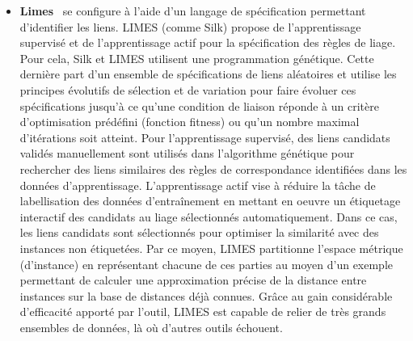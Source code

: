 \begin{itemize}
\item \textbf{Limes}~\cite{Ngomo2011} se configure à l'aide d'un langage de spécification permettant d'identifier les liens. LIMES (comme Silk) propose de l'apprentissage supervisé  et de l'apprentissage actif pour la spécification des règles de liage. Pour cela, Silk et LIMES utilisent une programmation génétique. Cette dernière part d'un ensemble de spécifications de liens aléatoires et utilise les principes évolutifs de sélection et de variation pour faire évoluer ces spécifications jusqu'à ce qu'une condition de liaison réponde à un critère d'optimisation prédéfini (fonction fitness) ou qu'un nombre maximal d'itérations soit atteint. Pour l'apprentissage supervisé, des liens candidats validés manuellement sont utilisés dans l'algorithme génétique pour rechercher des liens similaires des règles de correspondance identifiées dans les données d'apprentissage. L’apprentissage actif vise à réduire la tâche de labellisation des données d'entraînement en mettant en oeuvre un étiquetage interactif des candidats au liage sélectionnés automatiquement. Dans ce cas, les liens candidats sont sélectionnés pour optimiser la similarité avec des instances non étiquetées. Par ce moyen, LIMES partitionne l'espace métrique (d'instance) en représentant chacune de ces parties au moyen d'un exemple permettant de calculer une approximation précise de la distance entre instances sur la base de distances déjà connues. Grâce au gain considérable d’efficacité apporté par l’outil, LIMES est capable de relier de très grands ensembles de données, là où d’autres outils échouent.\\



\end{itemize}
